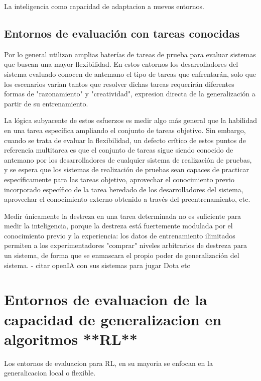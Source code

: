 La inteligencia como capacidad de adaptacion a nuevos entornos.


\subsection{Entornos de evaluación con tareas conocidas}\label{section:state-of-the-art:inteligence-evaluation-enviroments:evaluation-enviroments-with-know-tasks}

Por lo general utilizan amplias baterías de tareas de prueba para evaluar sistemas que buscan una mayor flexibilidad. En estos entornos los desarrolladores del sistema evaluado conocen de antemano el tipo de tareas que enfrentarán, solo que los escenarios varian tantos que resolver dichas tareas requerirán diferentes formas de "razonamiento" y "creatividad", expresion directa de la generalización a partir de su entrenamiento.

La lógica subyacente de estos esfuerzos es medir algo más general que la habilidad en una tarea específica ampliando el conjunto de tareas objetivo. Sin embargo, cuando se trata de evaluar la flexibilidad, un defecto crítico de estos puntos de referencia multitarea es que el conjunto de tareas sigue siendo conocido de antemano por los desarrolladores de cualquier sistema de realización de pruebas, y se espera que los sistemas de realización de pruebas sean capaces de practicar específicamente para las tareas objetivo, aprovechar el conocimiento previo incorporado específico de la tarea heredado de los desarrolladores del sistema, aprovechar el conocimiento externo obtenido a través del preentrenamiento, etc.

Medir únicamente la destreza en una tarea determinada no es suficiente para medir la inteligencia, porque la destreza está fuertemente modulada por el conocimiento previo y la experiencia: los datos de entrenamiento ilimitados permiten a los experimentadores "comprar" niveles arbitrarios de destreza para un sistema, de forma que se enmascara el propio poder de generalización del sistema.
- citar openIA con sus sistemas para jugar Dota etc

\section{Entornos de evaluacion de la capacidad de generalizacion en algoritmos **RL**}\label{section:state-of-the-art:evaluation-enviroments-for-generalization-on-rl-algoritms}

Los entornos de evaluacion para RL, en su mayoria se enfocan en la generalicacion local o flexible.

